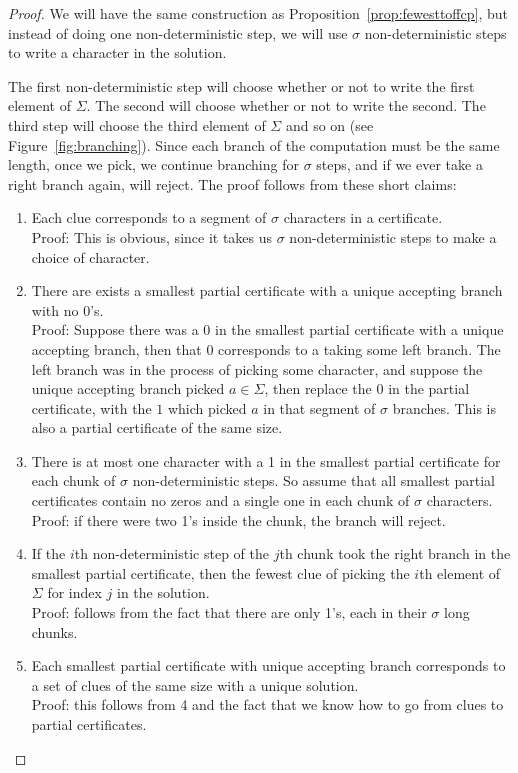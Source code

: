 \documentclass[runningheads,a4paper]{llncs}
\begin{document}
\begin{proof}
We will have the same construction as Proposition~\ref{prop:fewesttoffcp}, but instead of doing one non-deterministic step, we will use $\sigma$ non-deterministic steps to write a character in the solution.

The first non-deterministic step will choose whether or not to write the first element of $\Sigma$. The second will choose whether or not to write the second. The third step will choose the third element of $\Sigma$ and so on (see Figure~\ref{fig:branching}). Since each branch of the computation must be the same length, once we pick, we continue branching for $\sigma$ steps, and if we ever take a right branch again, will reject. The proof follows from these short claims:
\begin{enumerate}
\item Each clue corresponds to a segment of $\sigma$ characters in a certificate.\\
Proof: This is obvious, since it takes us $\sigma$ non-deterministic steps to make a choice of character.
\item There are exists a smallest partial certificate with a unique accepting branch with no 0's.\\
Proof: Suppose there was a 0 in the smallest partial certificate with a unique accepting branch, then that 0 corresponds to a taking some left branch. The left branch was in the process of picking some character, and suppose the unique accepting branch picked $a \in \Sigma$, then replace the 0 in the partial certificate, with the $1$ which picked $a$ in that segment of $\sigma$ branches. This is also a partial certificate of the same size. 
\item There is at most one character with a 1 in the smallest partial certificate for each chunk of $\sigma$ non-deterministic steps. So assume that all smallest partial certificates contain no zeros and a single one in each chunk of $\sigma$ characters.\\
Proof: if there were two 1's inside the chunk, the branch will reject.
\item If the $i$th non-deterministic step of the $j$th chunk took the right branch in the smallest partial certificate, then the fewest clue of picking the $i$th element of $\Sigma$ for index $j$ in the solution.\\
Proof: follows from the fact that there are only 1's, each in their $\sigma$ long chunks.
\item Each smallest partial certificate with unique accepting branch corresponds to a set of clues of the same size with a unique solution. \\
Proof: this follows from 4 and the fact that we know how to go from clues to partial certificates.
\end{enumerate}
\end{proof}
\end{document}
